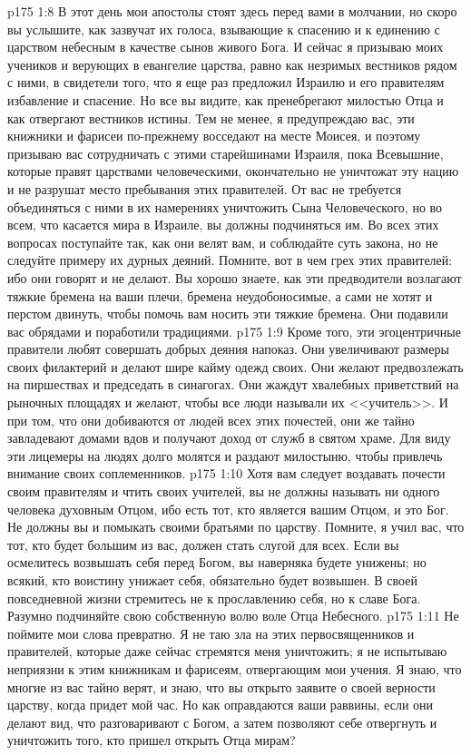\vs p175 1:8 В этот день мои апостолы стоят здесь перед вами в молчании, но скоро вы услышите, как зазвучат их голоса, взывающие к спасению и к единению с царством небесным в качестве сынов живого Бога. И сейчас я призываю моих учеников и верующих в евангелие царства, равно как незримых вестников рядом с ними, в свидетели того, что я еще раз предложил Израилю и его правителям избавление и спасение. Но все вы видите, как пренебрегают милостью Отца и как отвергают вестников истины. Тем не менее, я предупреждаю вас, эти книжники и фарисеи по\hyp{}прежнему восседают на месте Моисея, и поэтому призываю вас сотрудничать с этими старейшинами Израиля, пока Всевышние, которые правят царствами человеческими, окончательно не уничтожат эту нацию и не разрушат место пребывания этих правителей. От вас не требуется объединяться с ними в их намерениях уничтожить Сына Человеческого, но во всем, что касается мира в Израиле, вы должны подчиняться им. Во всех этих вопросах поступайте так, как они велят вам, и соблюдайте суть закона, но не следуйте примеру их дурных деяний. Помните, вот в чем грех этих правителей: ибо они говорят и не делают. Вы хорошо знаете, как эти предводители возлагают тяжкие бремена на ваши плечи, бремена неудобоносимые, а сами не хотят и перстом двинуть, чтобы помочь вам носить эти тяжкие бремена. Они подавили вас обрядами и поработили традициями.
\vs p175 1:9 Кроме того, эти эгоцентричные правители любят совершать добрых деяния напоказ. Они увеличивают размеры своих филактерий и делают шире кайму одежд своих. Они желают предвозлежать на пиршествах и председать в синагогах. Они жаждут хвалебных приветствий на рыночных площадях и желают, чтобы все люди называли их <<учитель>>. И при том, что они добиваются от людей всех этих почестей, они же тайно завладевают домами вдов и получают доход от служб в святом храме. Для виду эти лицемеры на людях долго молятся и раздают милостыню, чтобы привлечь внимание своих соплеменников.
\vs p175 1:10 Хотя вам следует воздавать почести своим правителям и чтить своих учителей, вы не должны называть ни одного человека духовным Отцом, ибо есть тот, кто является вашим Отцом, и это Бог. Не должны вы и помыкать своими братьями по царству. Помните, я учил вас, что тот, кто будет большим из вас, должен стать слугой для всех. Если вы осмелитесь возвышать себя перед Богом, вы наверняка будете унижены; но всякий, кто воистину унижает себя, обязательно будет возвышен. В своей повседневной жизни стремитесь не к прославлению себя, но к славе Бога. Разумно подчиняйте свою собственную волю воле Отца Небесного.
\vs p175 1:11 Не поймите мои слова превратно. Я не таю зла на этих первосвященников и правителей, которые даже сейчас стремятся меня уничтожить; я не испытываю неприязни к этим книжникам и фарисеям, отвергающим мои учения. Я знаю, что многие из вас тайно верят, и знаю, что вы открыто заявите о своей верности царству, когда придет мой час. Но как оправдаются ваши раввины, если они делают вид, что разговаривают с Богом, а затем позволяют себе отвергнуть и уничтожить того, кто пришел открыть Отца мирам?

